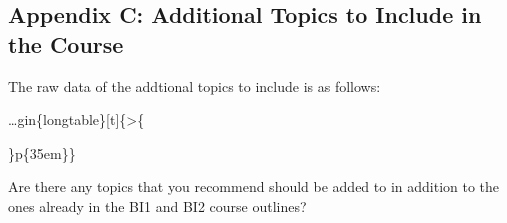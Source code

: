 \documentclass[
]{article}
\begin{document}
\newpage

\subsection{Appendix C: Additional Topics to Include in the
Course}\label{appendix-c-additional-topics-to-include-in-the-course}

The raw data of the addtional topics to include is as follows:

\ldots gin\{longtable\}{[}t{]}\{\textgreater\{

\raggedright

\arraybackslash\}p\{35em\}\}

\caption{\label{tab:AdditionalTopics}Are there any topics that you recommend should be added to in addition to the ones already in the BI1 and BI2 course outlines?}
\end{document}
